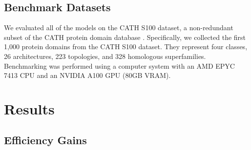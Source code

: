 \documentclass[runningheads]{llncs}
\begin{document}
\subsection{Benchmark Datasets}
We evaluated all of the models on the CATH S100 dataset, a non-redundant subset of the CATH protein domain database \cite{pearl2003cath}. Specifically, we collected the first 1,000 protein domains from the CATH S100 dataset. They represent four classes, 26 architectures, 223 topologies, and 328 homologous superfamilies. Benchmarking was performed using a computer system with an AMD EPYC 7413 CPU and an NVIDIA A100 GPU (80GB VRAM).

\section{Results}

\subsection{Efficiency Gains}

\begin{table}[htbp]
\centering
{}
\vspace{2pt}
\caption{Search and alignment speed for TM-Vec Student Model is compared against BLAST \cite{altschul1990basic}, TM-Vec, Foldseek and DIAMOND \cite{buchfink2021sensitive} for different query and database sizes.}
\label{tab:query_benchmark}
\end{table}
\end{document}
